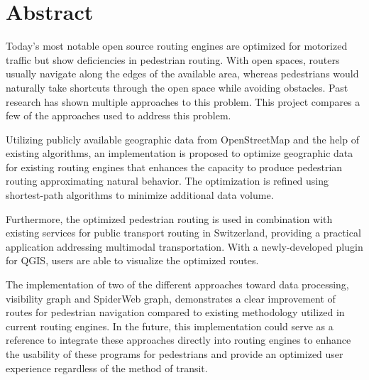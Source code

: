 \chapter*{Abstract}

Today's most notable open source routing engines are optimized for motorized traffic but show deficiencies in pedestrian routing. With open spaces, routers usually navigate along the edges of the available area, whereas pedestrians would naturally take shortcuts through the open space while avoiding obstacles.
Past research has shown multiple approaches to this problem. This project compares a few of the approaches used to address this problem.

Utilizing publicly available geographic data from OpenStreetMap and the help of existing algorithms, an implementation is proposed to optimize geographic data for existing routing engines that enhances the capacity to produce pedestrian routing approximating natural behavior. The optimization is refined using shortest-path algorithms to minimize additional data volume.

Furthermore, the optimized pedestrian routing is used in combination with existing services for public transport routing in Switzerland, providing a practical application addressing multimodal transportation. With a newly-developed plugin for QGIS, users are able to visualize the optimized routes.

The implementation of two of the different approaches toward data processing, visibility graph and SpiderWeb graph, demonstrates a clear improvement of routes for pedestrian navigation compared to existing methodology utilized in current routing engines. In the future, this implementation could serve as a reference to integrate these approaches directly into routing engines to enhance the usability of these programs for pedestrians and provide an optimized user experience regardless of the method of transit.